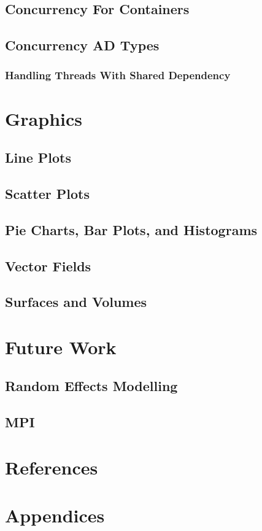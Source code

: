\documentclass[12pt,a4paper]{article}
\begin{document}
\subsection{Concurrency For Containers}
\subsection{Concurrency AD Types}
\subsubsection{Handling Threads With Shared Dependency}
\section{Graphics}
\subsection{Line Plots}
\subsection{Scatter Plots}
\subsection{Pie Charts, Bar Plots, and Histograms}
\subsection{Vector Fields}
\subsection{Surfaces and Volumes}
\section{Future Work}
\subsection{Random Effects Modelling}
\subsection{MPI}
\section{References}
\section{Appendices}
\end{document}
